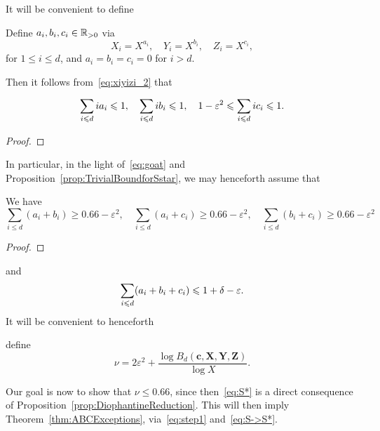 It will be convenient to define
\begin{definition} \label{def:aibici}
Define $a_i,b_i,c_i\in \mathbb{R}_{>0}$ via
\[
X_i=X^{a_i}, \quad Y_i=X^{b_i}, \quad Z_i=X^{c_i},
\]
for $1\leq i\leq d$, and $a_i=b_i=c_i=0$ for $i>d$.
\end{definition}
 Then it follows from~\eqref{eq:xiyizi_2} that
\begin{lemma}\label{lem:aibiciconstraints}
\begin{equation}\label{eq:oat1}
\sum_{i\leqslant d} ia_i \leqslant 1, \quad \sum_{i\leqslant d} ib_i \leqslant 1, \quad 1-\varepsilon^2\leqslant \sum_{i\leqslant d} ic_i \leqslant 1.
\end{equation}
\end{lemma}
\begin{proof}
\end{proof}
In particular, in the light of~\eqref{eq:goat} and
 Proposition~\ref{prop:TrivialBoundforSstar}, we
may henceforth assume that
\begin{lemma} \label{lem:Trivialaibici}
We have
\begin{equation}\label{eq:oat4}
\sum_{i\leq d} (a_i+b_i)\geq 0.66-\varepsilon^2,\quad \sum_{i\leq d} (a_i+c_i)\geq 0.66-\varepsilon^2,\quad
\sum_{i\leq d} (b_i+c_i) \geq 0.66-\varepsilon^2
\end{equation}
\end{lemma}
\begin{proof}
\end{proof}
and
\begin{equation}\label{eq:oat3}
\sum_{i\leqslant d} (a_i+b_i+c_i) \leqslant 1+\delta-\varepsilon.
\end{equation}
It will be convenient to henceforth
\begin{definition}\label{def:nu}
define
\[
\nu=2\varepsilon^2+\frac{\log B_d(\mathbf{c},\mathbf{X},\mathbf{Y},\mathbf{Z})}{\log X}.
\]
\end{definition}
Our goal is now to show that $\nu\le 0.66$, since then~\eqref{eq:S*}
is a direct consequence of
Proposition~\ref{prop:DiophantineReduction}.
This will then imply
Theorem~\ref{thm:ABCExceptions}, via~\eqref{eq:step1} and~\eqref{eq:S->S*}.


